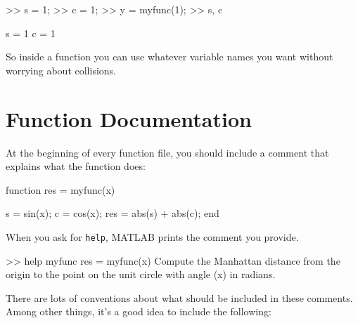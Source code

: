\begin{code}
>> s = 1;
>> c = 1;
>> y = myfunc(1);
>> s, c

s = 1
c = 1
\end{code}

So inside a function you can use whatever variable names you
want without worrying about collisions.



\section{Function Documentation}


At the beginning of every function file, you should include a comment that explains what the function does:


\begin{code}

function res = myfunc(x)

    s = sin(x);
    c = cos(x);
    res = abs(s) + abs(c);
end
\end{code}

When you ask for \lstinline{help}, MATLAB prints the comment you provide.


\begin{code}
>> help myfunc
  res = myfunc(x)
  Compute the Manhattan distance from the origin to the
  point on the unit circle with angle (x) in radians.
\end{code}

There are lots of conventions about what should be included
in these comments.  Among other things, it's a good idea to
include the following:

